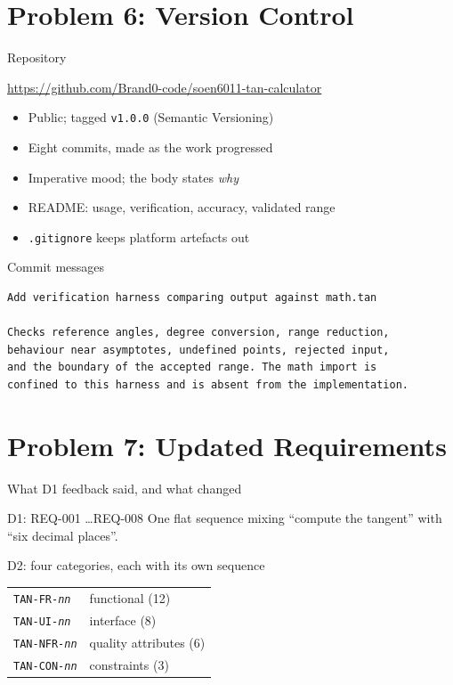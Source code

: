 \documentclass{beamer}
\begin{document}
\section{Problem 6: Version Control}

\begin{frame}{Repository}
  \begin{center}
    \small
    \url{https://github.com/Brand0-code/soen6011-tan-calculator}
  \end{center}
  \vfill
  \begin{itemize}
    \item Public; tagged \texttt{v1.0.0} (Semantic Versioning)
    \item Eight commits, made as the work progressed
    \item Imperative mood; the body states \emph{why}
    \item README: usage, verification, accuracy, validated range
    \item \texttt{.gitignore} keeps platform artefacts out
  \end{itemize}
\end{frame}

\begin{frame}[fragile]{Commit messages}
\begin{lstlisting}
Add verification harness comparing output against math.tan

Checks reference angles, degree conversion, range reduction,
behaviour near asymptotes, undefined points, rejected input,
and the boundary of the accepted range. The math import is
confined to this harness and is absent from the implementation.
\end{lstlisting}
\end{frame}

\section{Problem 7: Updated Requirements}

\begin{frame}{What D1 feedback said, and what changed}
  \begin{block}{D1: REQ-001 \ldots REQ-008}
    One flat sequence mixing ``compute the tangent'' with
    ``six decimal places''.
  \end{block}
  \vfill
  \begin{block}{D2: four categories, each with its own sequence}
    \begin{tabular}{ll}
      \texttt{TAN-FR-\textit{nn}}  & functional (12) \\
      \texttt{TAN-UI-\textit{nn}}  & interface (8) \\
      \texttt{TAN-NFR-\textit{nn}} & quality attributes (6) \\
      \texttt{TAN-CON-\textit{nn}} & constraints (3) \\
    \end{tabular}
  \end{block}
\end{frame}
\end{document}
